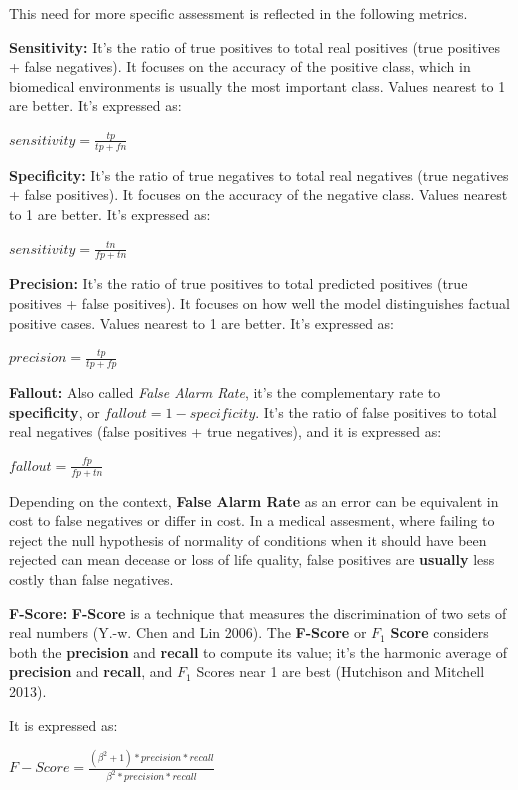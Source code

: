 \documentclass[]{article}
\begin{document}
This need for more specific assessment is reflected in the following
metrics.

\textbf{Sensitivity:} It's the ratio of true positives to total real
positives (true positives + false negatives). It focuses on the accuracy
of the positive class, which in biomedical environments is usually the
most important class. Values nearest to 1 are better. It's expressed as:

\(sensitivity = \frac{tp}{tp + fn}\)

\textbf{Specificity:} It's the ratio of true negatives to total real
negatives (true negatives + false positives). It focuses on the accuracy
of the negative class. Values nearest to 1 are better. It's expressed
as:

\(sensitivity = \frac{tn}{fp + tn}\)

\textbf{Precision:} It's the ratio of true positives to total predicted
positives (true positives + false positives). It focuses on how well the
model distinguishes factual positive cases. Values nearest to 1 are
better. It's expressed as:

\(precision = \frac{tp}{tp + fp}\)

\textbf{Fallout:} Also called \emph{False Alarm Rate}, it's the
complementary rate to \textbf{specificity}, or
\(fallout = 1 - specificity\). It's the ratio of false positives to
total real negatives (false positives + true negatives), and it is
expressed as:

\(fallout = \frac{fp}{fp + tn}\)

Depending on the context, \textbf{False Alarm Rate} as an error can be
equivalent in cost to false negatives or differ in cost. In a medical
assesment, where failing to reject the null hypothesis of normality of
conditions when it should have been rejected can mean decease or loss of
life quality, false positives are \textbf{usually} less costly than
false negatives.

\textbf{F-Score:} \textbf{F-Score} is a technique that measures the
discrimination of two sets of real numbers (Y.-w. Chen and Lin 2006).
The \textbf{F-Score} or \(F_1\) \textbf{Score} considers both the
\textbf{precision} and \textbf{recall} to compute its value; it's the
harmonic average of \textbf{precision} and \textbf{recall}, and \(F_1\)
Scores near 1 are best (Hutchison and Mitchell 2013).

It is expressed as:

\(F-Score = \frac{(\beta^2 + 1) * precision * recall}{\beta^2 * precision * recall}\)
\end{document}
